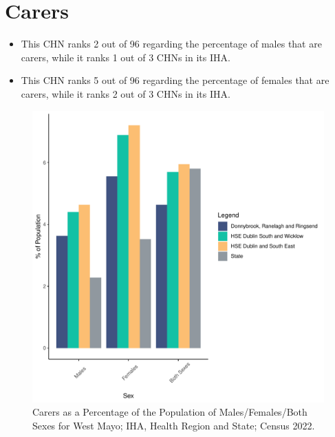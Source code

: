\documentclass{article}
\begin{document}
\section{Carers}\label{sect:Carers}
\begin{itemize}
\item This CHN ranks  2 out of 96 regarding the percentage of males that are carers, while it ranks   1 out of 3 CHNs in its IHA.
\item This CHN ranks  5 out of 96 regarding the percentage of females that are carers, while it ranks   2 out of 3 CHNs in its IHA.
\end{itemize}
\begin{figure}[H]
	\centering
	\includegraphics[width = 150mm]{../figures/CareED.pdf}
	\caption{Carers as a Percentage of the Population of Males/Females/Both Sexes for West Mayo; IHA, Health Region and State; Census 2022.}
	\label{fig:2ae19629-1a6a-13a3-e055-000000000001}
	\end{figure}
\end{document}
